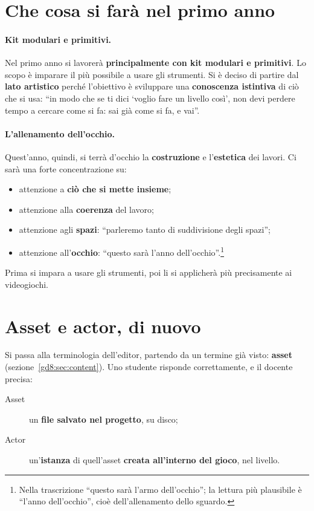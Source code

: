 \section{Che cosa si farà nel primo anno}
\label{gd11:sec:primo-anno}

\paragraph{Kit modulari e primitivi.} Nel primo anno si lavorerà
\textbf{principalmente con kit modulari e primitivi}. Lo scopo è imparare il più
possibile a usare gli strumenti. Si è deciso di partire dal \textbf{lato
artistico} perché l'obiettivo è sviluppare una \textbf{conoscenza istintiva} di
ciò che si usa: ``in modo che se ti dici `voglio fare un livello così', non devi
perdere tempo a cercare come si fa: sai già come si fa, e vai''.

\paragraph{L'allenamento dell'occhio.} Quest'anno, quindi, si terrà d'occhio la
\textbf{costruzione} e l'\textbf{estetica} dei lavori. Ci sarà una forte
concentrazione su:
\begin{itemize}
  \item attenzione a \textbf{ciò che si mette insieme};
  \item attenzione alla \textbf{coerenza} del lavoro;
  \item attenzione agli \textbf{spazi}: ``parleremo tanto di suddivisione degli
        spazi'';
  \item attenzione all'\textbf{occhio}: ``questo sarà l'anno
        dell'occhio''.\footnote{Nella trascrizione ``questo sarà l'armo
        dell'occhio''; la lettura più plausibile è ``l'anno dell'occhio'',
        cioè dell'allenamento dello sguardo.}
\end{itemize}
Prima si impara a usare gli strumenti, poi li si applicherà più precisamente ai
videogiochi.

\section{Asset e actor, di nuovo}
\label{gd11:sec:asset}

Si passa alla terminologia dell'editor, partendo da un termine già visto:
\textbf{asset} (sezione~\ref{gd8:sec:content}). Uno studente risponde
correttamente, e il docente precisa:
\begin{description}
  \item[Asset] un \textbf{file salvato nel progetto}, su disco;
  \item[Actor] un'\textbf{istanza} di quell'asset \textbf{creata all'interno
        del gioco}, nel livello.
\end{description}


